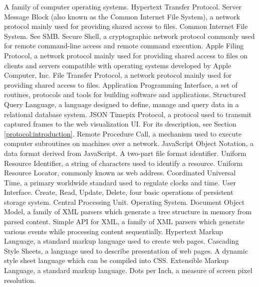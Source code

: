 		{A family of computer operating systems.}
		{Hypertext Transfer Protocol.}
		{Server Message Block (also known as the Common Internet File System), a network protocol mainly used for providing shared access to files.}
		{Common Internet File System. See SMB.}
		{Secure Shell, a cryptographic network protocol commonly used for remote command-line access and remote command execution.}
		{Apple Filing Protocol, a network protocol mainly used for providing shared access to files on clients and servers compatible with operating systems developed by Apple Computer, Inc.}
		{File Transfer Protocol, a network protocol mainly used for providing shared access to files.}
		{Application Programming Interface, a set of routines, protocols and tools for building software and applications.}
		{Structured Query Language, a language designed to define, manage and query data in a relational database system.}
		{JSON Timepix Protocol, a protocol used to transmit captured frames to the web visualization UI. For its description, see Section \ref{protocol:introduction}.}
		{Remote Procedure Call, a mechanism used to execute computer subroutines on machines over a network.}
		{JavaScript Object Notation, a data format derived from JavaScript.}
		{A two-part file format identifier.}
		{Uniform Resource Identifier, a string of characters used to identify a resource.}
		{Uniform Resource Locator, commonly known as web address.}
		{Coordinated Universal Time, a primary worldwide standard used to regulate clocks and time.}
		{User Interface.}
		{Create, Read, Update, Delete, four basic operations of persistent storage system.}
		{Central Processing Unit.}
		{Operating System.}
		{Document Object Model, a family of XML parsers which generate a tree structure in memory from parsed content.}
		{Simple API for XML, a family of XML parsers which generate various events while processing content sequentially.}
		{Hypertext Markup Language, a standard markup language used to create web pages. \cite{HtmlStandard}}
		{Cascading Style Sheets, a language used to describe presentation of web pages.}
		{A dynamic style sheet language which can be compiled into CSS.}
		{Extensible Markup Language, a standard markup language.}
		{Dots per Inch, a measure of screen pixel resolution.}

